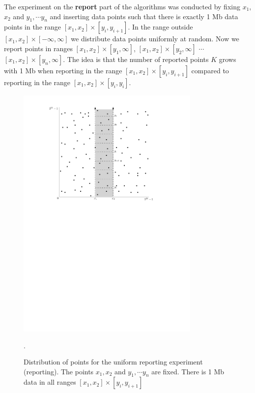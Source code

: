\documentclass[twoside,11pt,openright]{report}
\begin{document}
The experiment on the \textbf{report} part of the algorithms was conducted by fixing $x_1$, $x_2$ and $y_1, \cdots y_n$ and inserting data points such that there is exactly 
1 Mb data points in the range $[x_1, x_2] \times [y_i, y_{i+1}]$. In the range outside  $[x_1, x_2] \times [- \infty, \infty]$ we distribute data points uniformly at random. Now we report points in ranges $[x_1, x_2] \times [y_1, \infty]$, $[x_1, x_2] \times [y_2, \infty]$ $\cdots$ $[x_1, x_2] \times [y_n, \infty]$. The idea is that the number of reported points $K$ grows with 1 Mb when reporting in the range $[x_1, x_2] \times [y_i, y_{i+1}]$ compared to reporting in the range $[x_1, x_2] \times [y_i, y_{i}]$.

\begin{figure}[h]
	\centering
	\includegraphics[width=0.8\textwidth]{../figures/query_uniform_fix_x}
	\caption{Distribution of points for the uniform reporting experiment (reporting). The points $x_1, x_2$ and $y_1, \cdots y_n$ are fixed. There is 1 Mb data in all ranges $[x_1, x_2] \times [y_i, y_{i+1}]$}.
	\label{fig:experiment_query_uniform_fix_x}
\end{figure}

\end{document}
